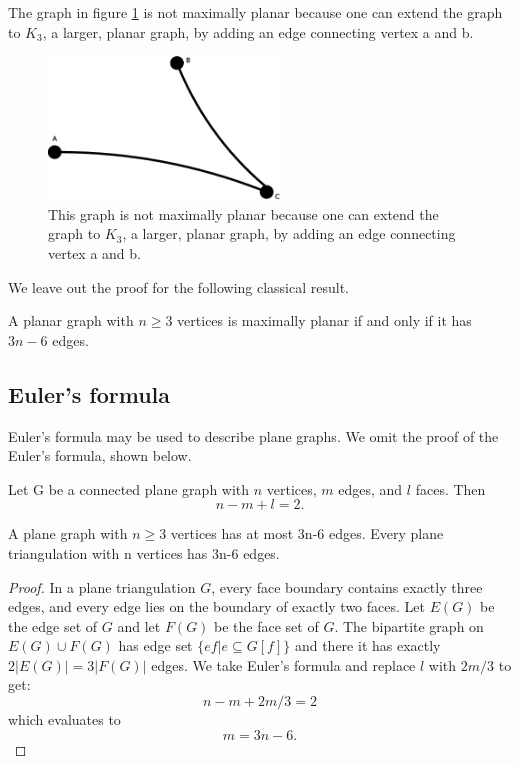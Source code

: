 The graph in figure \ref{fig4} is not maximally planar because one can extend the graph to $K_3$, a larger, planar graph, by adding an edge connecting vertex a and b.	
\begin{figure}
	\centering
\includegraphics[height=1.5in]{k3_notmax}
\caption{This graph is not maximally planar because one can extend the graph to $K_3$, a larger, planar graph, by adding an edge connecting vertex a and b.}
\label{fig4}
\end{figure}

We leave out the proof for the following classical result.
\begin{lemma}\label{planarn3}
A planar graph with $n\geq 3$ vertices is maximally planar if and only if it has $3n-6$ edges.
\end{lemma}


\subsection{Euler's formula}
Euler's formula may be used to describe plane graphs. We omit the proof of the Euler's formula, shown below.
\begin{theorem}
Let G be a connected plane graph with $n$ vertices, $m$ edges, and $l$ faces. Then 
$$n-m+l=2.$$
\end{theorem}

\begin{corollary}\label{coro_euler}
A plane graph with $n \geq 3$ vertices has at most 3n-6 edges. Every plane triangulation with n vertices has 3n-6 edges. 
\end{corollary}
\begin{proof}
In a plane triangulation $G$, every face boundary contains exactly three edges, and every edge lies on the boundary of exactly two faces. Let $E(G)$ be the edge set of $G$ and let $F(G)$ be the face set of $G$. The bipartite graph on $E(G) \cup F(G)$ has edge set $\{ef | e \subseteq G[f]\}$ and there it has exactly $2|E(G)| = 3|F(G)|$ edges. We take Euler's formula and replace $l$ with $2m/3$ to get:
$$n - m +2m/3 = 2$$ which evaluates to $$m=3n-6.$$
\end{proof}


